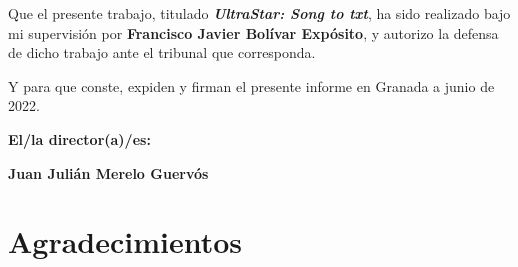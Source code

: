 \vspace{0.5cm}

Que el presente trabajo, titulado \textit{\textbf{UltraStar: Song to txt}},
ha sido realizado bajo mi supervisión por \textbf{Francisco Javier Bolívar Expósito}, y autorizo la defensa de dicho trabajo ante el tribunal
que corresponda.

\vspace{0.5cm}

Y para que conste, expiden y firman el presente informe en Granada a junio de 2022.

\vspace{1cm}

\textbf{El/la director(a)/es: }

\vspace{5cm}

\noindent \textbf{Juan Julián Merelo Guervós}

\chapter*{Agradecimientos}




